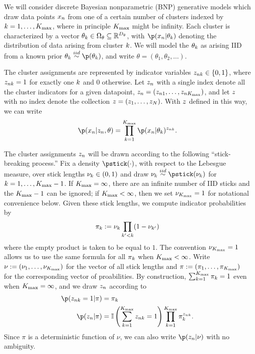 We will consider discrete Bayesian nonparametric (BNP) generative models which
draw data points $x_n$ from one of a certain number of clusters indexed by $k =
1, \ldots, {K_{\mathrm{max}}}$, where in principle ${K_{\mathrm{max}}}$ might be infinity.  Each cluster
is characterized by a vector $\theta_k \in \Omega_{\theta} \subseteq
\mathbb{R}^{{D_{\theta}}}$, with $\p(\x_n \vert \theta_\k)$ denoting the
distribution of data arising from  cluster $k$. We will model the $\theta_k$
as arising IID from a known prior $\theta_\k \iid \p(\theta_\k)$, and write
$\theta = (\theta_1, \theta_2, \ldots)$.

The cluster assignments are represented by indicator variables $z_{nk} \in
\{0, 1\}$, where $z_{nk} = 1$ for exactly one $k$ and $0$ otherwise.  Let
$z_n$ with a single index denote all the cluster indicators for a given
datapoint, $z_n = (z_{n1}, \ldots, z_{n{K_{\mathrm{max}}}})$, and let $z$ with no
index denote the collection $z = (z_1, \ldots, z_N)$.  With $z$ defined in
this way, we can write
%
\begin{align*}
%
\p(\x_n \vert \z_\n, \theta) =
    \prod_{k=1}^\kmax \p(\x_n \vert \theta_\k)^{\z_{\n\k}}.
%
\end{align*}


The cluster assignments $z_{n}$ will be drawn according to the following
``stick-breaking process.''  Fix a density $\pstick(\cdot)$, with respect to the
Lebesgue measure, over stick lengths $\nu_{k} \in (0, 1)$ and draw $\nuk \iid
\pstick(\nuk)$ for $k=1,\ldots,{K_{\mathrm{max}}} - 1$.  If ${K_{\mathrm{max}}} = \infty$, there are an
infinite number of IID sticks and the ${K_{\mathrm{max}}} - 1$ can be ignored; if ${K_{\mathrm{max}}} <
\infty$, then we set $\nu_{{K_{\mathrm{max}}}} = 1$ for notational convenience below.  Given
these stick lengths, we compute indicator probabilities by
%
\begin{align*}
%
\pi_\k := \nuk \prod_{\k' < \k} (1 - \nu_{\k'})
%
\end{align*}
%
where the empty product is taken to be equal to $1$. The convention $\nu_{{K_{\mathrm{max}}}} =
1$ allows us to use the same formula for all $\pi_k$ when ${K_{\mathrm{max}}} < \infty$.
Write $\nu := (\nu_1, \ldots, \nu_{{K_{\mathrm{max}}}})$ for the vector of all stick lengths
and $\pi := (\pi_1, \ldots, \pi_{K_{\mathrm{max}}})$ for the corresponding vector of
proabilities. By construction, $\sum_{k=1}^{{K_{\mathrm{max}}}} \pi_k = 1$ even when ${K_{\mathrm{max}}} =
\infty$, and we draw $z_n$ according to
%
\begin{align*}
%
\p(\z_{\n\k} = 1 \vert \pi) ={}& \pi_\k \\
\p(\z_\n \vert \pi) ={}&
    \ind{\sum_{\k=1}^{\kmax} \z_{\n\k} = 1}
    \prod_{k=1}^{\kmax} \pi_\k^{\z_{\n\k}}.
%
\end{align*}
%
Since $\pi$ is a deterministic function of $\nu$, we can also write
$\p(\z_\n \vert \nu)$ with no ambiguity.

